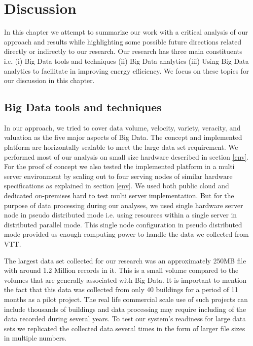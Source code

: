 \chapter{Discussion}
\label{chapter:discussion}
In this chapter we attempt to summarize our work with a critical analysis of our approach and results while highlighting some possible future directions related directly or indirectly to our research. Our research has three main constituents i.e. (i) Big Data tools and techniques (ii) Big Data analytics (iii) Using Big Data analytics to facilitate in improving energy efficiency. We focus on these topics for our discussion in this chapter.    

\section{Big Data tools and techniques}
In our approach, we tried to cover data volume, velocity, variety, veracity, and valuation as the five major aspects of Big Data. The concept and implemented platform are horizontally scalable to meet the large data set requirement. We performed most of our analysis on small size hardware described in section \ref{env}. For the proof of concept we also tested the implemented platform in a multi server environment by scaling out to four serving nodes of similar hardware specifications as explained in section \ref{env}. We used both public cloud and dedicated on-premises hard to test multi server implementation. But for the purpose of data processing during our analyses, we used single hardware server node in pseudo distributed mode i.e. using resources within a single server in distributed parallel mode. This single node configuration in pseudo distributed mode provided us enough computing power to handle the data we collected from VTT. 

The largest data set collected for our research was an approximately 250MB file with around 1.2 Million records in it. This is a small volume compared to the volumes that are generally associated with Big Data. It is important to mention the fact that this data was collected from only 40 buildings for a period of 11 months as a pilot project. The real life commercial scale use of such projects can include thousands of buildings and data processing may require including of the data recorded  during several years. To test our system's readiness for large data sets we replicated the collected data several times in the form of larger file sizes in multiple numbers. 

